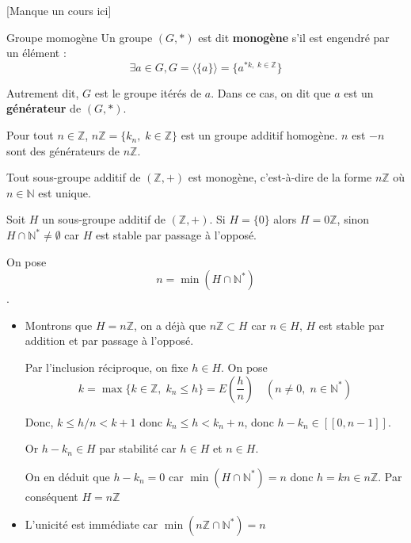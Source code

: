 [Manque un cours ici]



\begin{Definition}[colbacktitle=red!75!black]{Groupe momogène}{}
Un groupe $(G, *)$ est dit \textbf{monogène} s'il est engendré par un élément : 
\begin{equation}
  \exists a \in G, G = \langle \{ a \} \rangle = \{ a ^{*k, \; k \in \mathbb{Z}}\}
\end{equation}

Autrement dit, $G$ est le groupe itérés de $a$. Dans ce cas, on dit que $a$ est un \textbf{générateur} de $(G, *)$.


\end{Definition}


\begin{Example}{}{}
    Pour tout $n \in \mathbb{Z}$, $n \mathbb{Z} = \{ k_n, \; k \in \mathbb{Z}\}$ est un groupe additif homogène. $n$ est $-n$ sont des générateurs de $n \mathbb{Z}$.
\end{Example}


\begin{Theorem}{}{}
Tout sous-groupe additif de $(\mathbb{Z}, +)$ est monogène, c'est-à-dire de la forme $n \mathbb{Z}$ où $n \in \mathbb{N}$ est unique.
\end{Theorem}

\begin{myproof}{}{}
  Soit $H$ un sous-groupe additif de $(\mathbb{Z}, +)$. Si $H = \{0 \}$ alors $H = 0 \mathbb{Z}$, sinon $H \cap \mathbb{N} ^{*} \ne \emptyset$ car $H$ est stable par passage à l'opposé.

  On pose $$n = \min (H \cap \mathbb{N} ^{*})$$. 

  \begin{itemize}

      \item Montrons que $H = n \mathbb{Z}$, on a déjà que $n \mathbb{Z} \subset H$ car $ n \in H$, $H$ est stable par addition et par passage à l'opposé.

  Par l'inclusion réciproque, on fixe $h \in H$. On pose 
  \begin{equation}
    k = \max \{ k \in \mathbb{Z}, \; k_n \le h\} = E \left( \frac{h}{n}  \right) \quad ( n \ne 0, \; n \in \mathbb{N} ^{*})
  \end{equation}

  Donc, $k \le h/n < k+1$ donc $k_n \le h < k_n+n$, donc $ h -k_n \in [\![0, n-1]\!]$. 

  Or $h - k_n \in H$ par stabilité car $h \in H$ et $n \in H$.

  On en déduit que $h - k_n = 0 $ car $\min (H \cap \mathbb{N} ^{*}) = n$ donc $h = kn \in n \mathbb{Z}$. Par conséquent $  H = n \mathbb{Z}$

\item L'unicité est immédiate car $\min ( n \mathbb{Z} \cap \mathbb{N} ^{*}) = n$

  \end{itemize}
\end{myproof}

